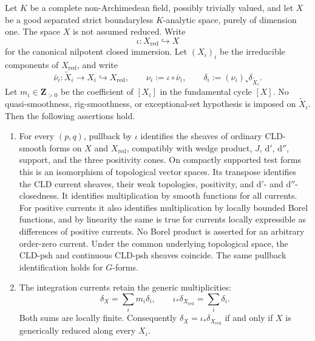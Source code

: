 
\begin{proposition}
\label{prop:p213-componentwise-arbitrary-valuation}
Let $K$ be a complete non-Archimedean field, possibly trivially valued,
and let $X$ be a good separated strict boundaryless $K$-analytic space,
purely of dimension one.  The space $X$ is not assumed reduced.  Write
\[
                 \iota:X_{\mathrm{red}}\hookrightarrow X
\]
for the canonical nilpotent closed immersion.  Let $(X_i)_i$ be the
irreducible components of $X_{\mathrm{red}}$, and write
\[
 \bar\nu_i:\widetilde X_i\longrightarrow X_i
       \hookrightarrow X_{\mathrm{red}},
 \qquad
 \nu_i:=\iota\circ\bar\nu_i,
 \qquad
 \delta_i:=(\nu_i)_*\delta_{\widetilde X_i}.
\]
Let $m_i\in\mathbf Z_{>0}$ be the coefficient of $[X_i]$ in the
fundamental cycle $[X]$.  No quasi-smoothness, rig-smoothness, or
exceptional-set hypothesis is imposed on $\widetilde X_i$.  Then the
following assertions hold.

\begin{enumerate}
\item\label{itm:p213-componentwise-av:calculus}
For every $(p,q)$, pullback by $\iota$ identifies the sheaves of ordinary
CLD-smooth forms on $X$ and $X_{\mathrm{red}}$, compatibly with wedge
product, $J$, $\mathrm d'$, $\mathrm d''$, support, and the three positivity
cones.  On compactly supported test forms this is an isomorphism of
topological vector spaces.  Its transpose identifies the CLD current
sheaves, their weak topologies, positivity, and
$\mathrm d'$- and $\mathrm d''$-closedness.  It identifies multiplication
by smooth functions for all currents.  For positive currents it also
identifies multiplication by locally bounded Borel functions, and by
linearity the same is true for currents locally expressible as differences
of positive currents.  No Borel product is asserted for an arbitrary
order-zero current.  Under the common underlying topological space, the
CLD-psh and continuous CLD-psh sheaves coincide.  The same pullback
identification holds for $G$-forms.

\item\label{itm:p213-componentwise-av:integration}
The integration currents retain the generic multiplicities:
\begin{equation}
 \label{eq:p213-componentwise-av-fundamental-cycles}
       \delta_X=\sum_i m_i\delta_i,
       \qquad
       \iota_*\delta_{X_{\mathrm{red}}}=\sum_i\delta_i.
\end{equation}
Both sums are locally finite.  Consequently
$\delta_X=\iota_*\delta_{X_{\mathrm{red}}}$ if and only if $X$ is
generically reduced along every $X_i$.


\end{enumerate}
\end{proposition}
